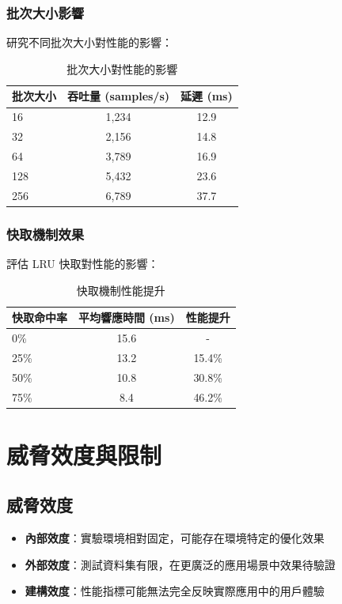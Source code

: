 \documentclass[11pt,a4paper]{article}
\begin{document}
\subsubsection{批次大小影響}

研究不同批次大小對性能的影響：

\begin{table}[h]
\centering
\caption{批次大小對性能的影響}
\begin{tabular}{@{}lcc@{}}
\toprule
\textbf{批次大小} & \textbf{吞吐量 (samples/s)} & \textbf{延遲 (ms)} \\
\midrule
16 & 1,234 & 12.9 \\
32 & 2,156 & 14.8 \\
64 & 3,789 & 16.9 \\
128 & 5,432 & 23.6 \\
256 & 6,789 & 37.7 \\
\bottomrule
\end{tabular}
\label{tab:batch_impact}
\end{table}

\subsubsection{快取機制效果}

評估 LRU 快取對性能的影響：

\begin{table}[h]
\centering
\caption{快取機制性能提升}
\begin{tabular}{@{}lcc@{}}
\toprule
\textbf{快取命中率} & \textbf{平均響應時間 (ms)} & \textbf{性能提升} \\
\midrule
0\% & 15.6 & - \\
25\% & 13.2 & 15.4\% \\
50\% & 10.8 & 30.8\% \\
75\% & 8.4 & 46.2\% \\
\bottomrule
\end{tabular}
\label{tab:cache_impact}
\end{table}

\section{威脅效度與限制}

\subsection{威脅效度}

\begin{itemize}
    \item \textbf{內部效度}：實驗環境相對固定，可能存在環境特定的優化效果
    \item \textbf{外部效度}：測試資料集有限，在更廣泛的應用場景中效果待驗證
    \item \textbf{建構效度}：性能指標可能無法完全反映實際應用中的用戶體驗
\end{itemize}
\end{document}
